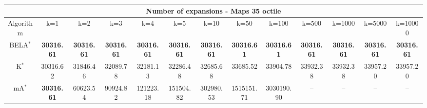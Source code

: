 \begin{tabular}{c|cccccccccccc}\toprule
\multicolumn{13}{c}{Number of expansions - Maps 35 octile}\\ \midrule
Algorithm & k=1 & k=2 & k=3 & k=4 & k=5 & k=10 & k=50 & k=100 & k=500 & k=1000 & k=5000 & k=10000 \\ \midrule
BELA$^*$ & \textbf{30316.61} & \textbf{30316.61} & \textbf{30316.61} & \textbf{30316.61} & \textbf{30316.61} & \textbf{30316.61} & \textbf{30316.61} & \textbf{30316.61} & \textbf{30316.61} & \textbf{30316.61} & \textbf{30316.61} & \textbf{30316.61} \\
K$^*$ & 30316.62 & 31846.46 & 32089.78 & 32181.13 & 32286.48 & 32685.68 & 33685.52 & 33904.78 & 33932.38 & 33932.38 & 33957.20 & 33957.20 \\
mA$^*$ & \textbf{30316.61} & 60623.54 & 90924.82 & 121223.18 & 151504.82 & 302980.53 & 1515151.71 & 3030190.90 & -- & -- & -- & -- \\ \bottomrule 
\end{tabular}
